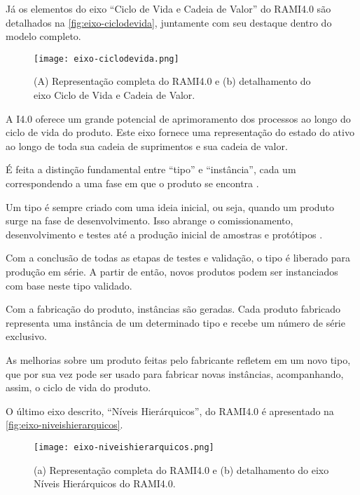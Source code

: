	Já os elementos do eixo ``Ciclo de Vida e Cadeia de Valor'' do RAMI4.0 são detalhados na \autoref{fig:eixo-ciclodevida}, juntamente com seu destaque dentro do modelo completo.
	
	\begin{figure}[htb]
		\centering
		\caption{(A) Representação completa do RAMI4.0 e (b) detalhamento do eixo Ciclo de Vida e Cadeia de Valor.}
		\label{fig:eixo-ciclodevida}
		\texttt{[image: eixo-ciclodevida.png]}
	\end{figure}

	A I4.0 oferece um grande potencial de aprimoramento dos processos ao longo do ciclo de vida do produto. Este eixo fornece uma representação do estado do ativo ao longo de toda sua cadeia de suprimentos e sua cadeia de valor. 
	
	É feita a distinção fundamental entre ``tipo'' e ``instância'', cada um correspondendo a uma fase em que o produto se encontra \cite{adolphs2015rami}.
	
	Um tipo é sempre criado com uma ideia inicial, ou seja, quando um produto surge na fase de desenvolvimento. Isso abrange o comissionamento, desenvolvimento e testes até a produção inicial de amostras e protótipos \cite{adolph2018roadmap}. 
	
	Com a conclusão de todas as etapas de testes e validação, o tipo é liberado para produção em série. A partir de então, novos produtos podem ser instanciados com base neste tipo validado. 
	
	Com a fabricação do produto, instâncias são geradas. Cada produto fabricado representa uma instância de um determinado tipo e recebe um número de série exclusivo.
	
	As melhorias sobre um produto feitas pelo fabricante refletem em um novo tipo, que por sua vez pode ser usado para fabricar novas instâncias, acompanhando, assim, o ciclo de vida do produto.

	O último eixo descrito, ``Níveis Hierárquicos'', do RAMI4.0 é apresentado na \autoref{fig:eixo-niveishierarquicos}.
	
	\begin{figure}[htb]
		\centering
		\caption{(a) Representação completa do RAMI4.0 e (b) detalhamento do eixo Níveis Hierárquicos do RAMI4.0.}
		\label{fig:eixo-niveishierarquicos}
		\texttt{[image: eixo-niveishierarquicos.png]}
	\end{figure}

